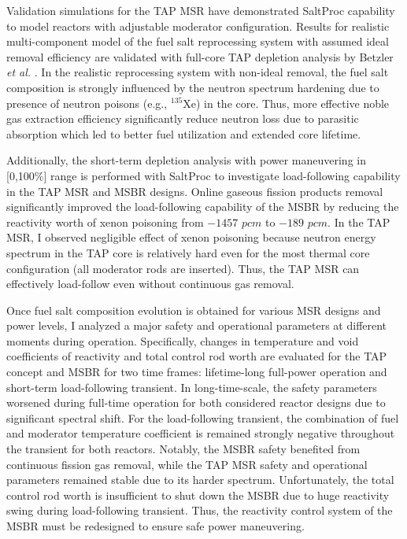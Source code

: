 Validation simulations for the \gls{TAP} \gls{MSR} have demonstrated SaltProc 
capability to model reactors with adjustable moderator configuration. Results 
for realistic multi-component model of the fuel salt reprocessing system with 
assumed ideal removal efficiency are validated with full-core \gls{TAP} 
depletion analysis by Betzler \emph{et al.} \cite{betzler_assessment_2017-1}. 
In the realistic reprocessing system with non-ideal removal, the fuel salt 
composition is strongly influenced by the neutron spectrum hardening due to 
presence of neutron poisons (e.g., $^{135}$Xe) in the core. Thus, more 
effective noble gas extraction efficiency significantly reduce neutron loss 
due to parasitic absorption which led to
better fuel utilization and extended 
core lifetime.

Additionally, the short-term depletion analysis with power maneuvering in
[0,100\%] range is performed with SaltProc to investigate load-following 
capability in the \gls{TAP} \gls{MSR} and \gls{MSBR} designs. Online gaseous 
fission products removal significantly improved the load-following capability 
of the \gls{MSBR} by reducing the reactivity worth of xenon poisoning from 
$-1457$ $pcm$ to $-189$ $pcm$. In the \gls{TAP} \gls{MSR}, I observed 
negligible effect of xenon poisoning because neutron energy spectrum in the 
\gls{TAP} core is relatively hard even for the most thermal core configuration 
(all moderator rods are inserted). Thus, the \gls{TAP} \gls{MSR} can 
effectively load-follow even without continuous gas removal.

Once fuel salt composition evolution is obtained for various \gls{MSR} 
designs and power levels, I analyzed a major safety and operational parameters 
at different moments during operation. Specifically, changes in temperature 
and void coefficients of reactivity and total control rod worth are evaluated 
for the \gls{TAP} concept and \gls{MSBR} for two time frames: lifetime-long 
full-power operation and short-term load-following transient. In 
long-time-scale, the safety parameters worsened during full-time operation for 
both considered reactor designs due to significant spectral shift. For the 
load-following transient, the combination of fuel and moderator temperature 
coefficient is remained strongly negative throughout the transient for both 
reactors. Notably, the \gls{MSBR} safety benefited from continuous fission gas 
removal, while the \gls{TAP} \gls{MSR} safety and operational parameters 
remained stable due to its harder spectrum. Unfortunately, the total control 
rod worth is insufficient to shut down the \gls{MSBR} due to huge reactivity 
swing during load-following transient. Thus, the reactivity control system of 
the \gls{MSBR} must be redesigned to ensure safe power maneuvering.

